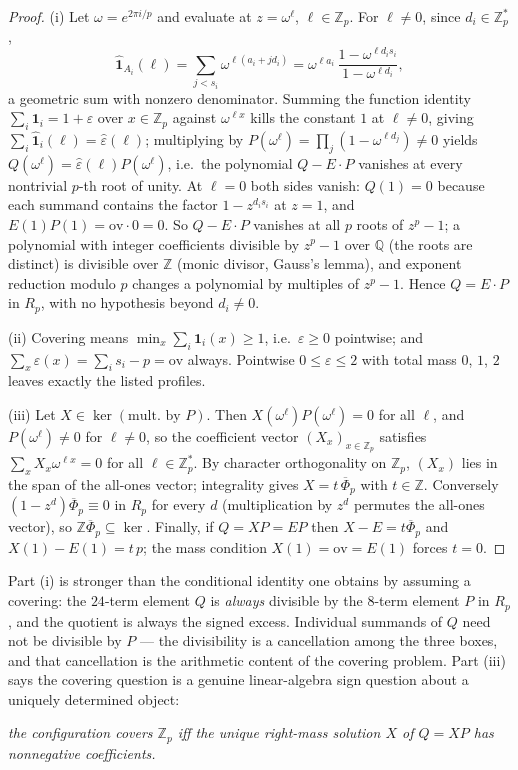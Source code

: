 \documentclass[11pt,a4paper]{article}
\numberwithin{equation}{section}
\theoremstyle{plain}
\theoremstyle{definition}
\theoremstyle{remark}
\newcommand{\Z}{\mathbb{Z}}
\begin{document}
\begin{proof}
(i) Let $\omega=e^{2\pi i/p}$ and evaluate at $z=\omega^\ell$,
$\ell\in\Z_p$. For $\ell\ne 0$, since $d_i\in\Z_p^{*}$,
\[
\widehat{\mathbf 1}_{A_i}(\ell)
=\sum_{j<s_i}\omega^{\ell(a_i+jd_i)}
=\omega^{\ell a_i}\,\frac{1-\omega^{\ell d_i s_i}}{1-\omega^{\ell d_i}},
\]
a geometric sum with nonzero denominator. Summing the function identity
$\sum_i\mathbf 1_i=1+\varepsilon$ over $x\in\Z_p$ against $\omega^{\ell x}$
kills the constant $1$ at $\ell\ne0$, giving
$\sum_i\widehat{\mathbf 1}_i(\ell)=\widehat\varepsilon(\ell)$; multiplying by
$P(\omega^\ell)=\prod_j(1-\omega^{\ell d_j})\ne 0$ yields
$Q(\omega^\ell)=\widehat\varepsilon(\ell)P(\omega^\ell)$, i.e.\ the
polynomial $Q-E\cdot P$ vanishes at every nontrivial $p$-th root of unity.
At $\ell=0$ both sides vanish: $Q(1)=0$ because each summand contains the
factor $1-z^{d_is_i}$ at $z=1$, and $E(1)P(1)=\mathrm{ov}\cdot 0=0$. So
$Q-E\cdot P$ vanishes at all $p$ roots of $z^p-1$; a polynomial with integer
coefficients divisible by $z^p-1$ over $\mathbb{Q}$ (the roots are distinct) is
divisible over $\Z$ (monic divisor, Gauss's lemma), and exponent reduction
modulo $p$ changes a polynomial by multiples of $z^p-1$. Hence
$Q=E\cdot P$ in $R_p$, with no hypothesis beyond $d_i\ne 0$.

(ii) Covering means $\min_x\sum_i\mathbf 1_i(x)\ge 1$, i.e.\ $\varepsilon\ge
0$ pointwise; and $\sum_x\varepsilon(x)=\sum_i s_i-p=\mathrm{ov}$ always.
Pointwise $0\le\varepsilon\le 2$ with total mass $0$, $1$, $2$ leaves exactly
the listed profiles.

(iii) Let $X\in\ker(\text{mult.\ by }P)$. Then $X(\omega^\ell)P
(\omega^\ell)=0$ for all $\ell$, and $P(\omega^\ell)\ne 0$ for $\ell\ne 0$,
so the coefficient vector $(X_x)_{x\in\Z_p}$ satisfies
$\sum_x X_x\omega^{\ell x}=0$ for all $\ell\in\Z_p^{*}$. By character
orthogonality on $\Z_p$, $(X_x)$ lies in the span of the all-ones vector;
integrality gives $X=t\,\overline\Phi_p$ with $t\in\Z$. Conversely
$(1-z^{d})\overline\Phi_p\equiv 0$ in $R_p$ for every $d$ (multiplication by
$z^d$ permutes the all-ones vector), so $\Z\overline\Phi_p\subseteq\ker$.
Finally, if $Q=XP=EP$ then $X-E=t\overline\Phi_p$ and
$X(1)-E(1)=t\,p$; the mass condition $X(1)=\mathrm{ov}=E(1)$ forces $t=0$.
\end{proof}

Part (i) is stronger than the conditional identity one obtains by assuming a
covering: the $24$-term element $Q$ is \emph{always} divisible by the
$8$-term element $P$ in $R_p$, and the quotient is always the signed excess.
Individual summands of $Q$ need not be divisible by $P$ --- the divisibility
is a cancellation among the three boxes, and that cancellation is the
arithmetic content of the covering problem. Part (iii) says the covering
question is a genuine linear-algebra sign question about a uniquely
determined object:
\begin{center}
\emph{the configuration covers $\Z_p$ iff the unique right-mass
solution $X$ of $Q=XP$ has nonnegative coefficients.}
\end{center}
\end{document}
